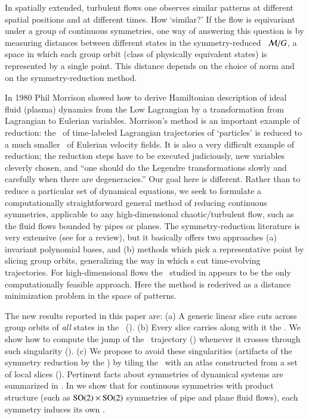 \documentclass[preprint,12pt]{elsarticle} %
\begin{document}
In spatially extended, turbulent flows one observes similar patterns at
different spatial positions and at different times. How `similar?' If the
flow is equivariant under a group of continuous symmetries, one way of
answering this question is by measuring distances between different
states in the symmetry-reduced \statesp\ ${\cal M}/G$, a space in which
each group orbit (class of physically equivalent states) is represented
by a single point. This distance depends on the choice of norm and on
the symmetry-reduction method.

													\toCB
In 1980 Phil Morrison showed how to derive Hamiltonian
description of ideal fluid (plasma) dynamics from the Low
Lagrangian by a transformation from Lagrangian to Eulerian
variables.
Morrison's method is an important example of
reduction: the \statesp\ of time-labeled Lagrangian trajectories of
`particles' is reduced to a much smaller \statesp\ of Eulerian velocity
fields. It is also a very
difficult example of reduction; the reduction steps have to be
executed judiciously, new variables cleverly chosen, and ``one should do
the Legendre transformations slowly and carefully when there are
degeneracies.'' Our goal here is different. Rather than to
reduce a particular set of dynamical equations, we seek to formulate a
computationally straightforward general method of reducing continuous
symmetries, applicable to any high-dimensional chaotic/turbulent flow,
such as the fluid flows bounded by pipes or planes. The
symmetry-reduction literature is very extensive (see
 for a review), but it basically offers two
approaches (a) invariant polynomial bases, and (b) methods which pick a
representative point by slicing group orbits, generalizing the way in
which {\PoincSec}s cut time-evolving trajectories. For high-dimensional
flows the \mslices\ studied in 
appears to be the only computationally feasible approach. Here
the method is rederived as a distance minimization problem in the space
of patterns.

The new results reported in this paper are:
    (a) A generic linear slice cuts across group orbits of {\em all}
        states in the \statesp\ ().
    (b) Every slice carries along with it the {\sset}. We show how to
        compute the jump of the \reducedsp\ trajectory
         () whenever it crosses
        through such singularity  ().
    (c) We propose to avoid these singularities (artifacts of the symmetry
        reduction by the \mslices) by tiling the \statesp\ with an atlas
        constructed from a set of local slices  ().
Pertinent facts about symmetries of dynamical systems are summarized in
. In   we show that for
continuous symmetries with product structure (such as $\textrm{SO}(2) \times
\textrm{SO}(2)$ symmetries of pipe and plane fluid flows), each symmetry induces
its own {\sset}.
\end{document}
